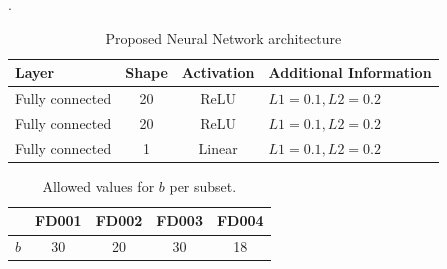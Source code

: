 \documentclass[preprint,12pt]{elsarticle}%
\begin{document}
\begin{table}
\begin{center}
\caption{Proposed Neural Network architecture}.%
%

\begin{tabular}
[c]{llll}\hline
Layer & Shape & Activation & Additional Information\\\hline\hline
Fully connected & \multicolumn{1}{c}{20} & \multicolumn{1}{c}{ReLU} &
$L1=0.1,L2=0.2$\\
Fully connected & \multicolumn{1}{c}{20} & \multicolumn{1}{c}{ReLU} &
$L1=0.1,L2=0.2$\\
Fully connected & \multicolumn{1}{c}{1} & \multicolumn{1}{c}{Linear} &
$L1=0.1,L2=0.2$\\\hline
\end{tabular}
\label{table:proposed_nn}%

\end{center}
\end{table}%
%

\begin{table}
\begin{center}
\caption{Allowed values for $b$ per subset.}%
%

\begin{tabular}
[c]{c|cccc}\hline
& FD001 & FD002 & FD003 & FD004\\\hline
$b$ & 30 & 20 & 30 & 18\\\hline
\end{tabular}
\label{table:b_values}%

\end{center}
\end{table}%
%
\end{document}
